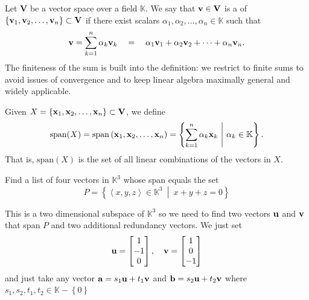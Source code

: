 \begin{dfn}
    Let \( \mathbf{V} \) be a vector space over a field \( \mathbb{K} \).  
    We say that \( \vb{v} \in \mathbf{V} \) is a  of  
    \( \left\{ \vb{v}_{1}, \vb{v}_{2}, \dots, \vb{v}_{n} \right\} \subset \mathbf{V} \)  
    if there exist scalars \( \alpha_{1}, \alpha_{2}, \dots, \alpha_{n} \in \mathbb{K} \) such that  
    \[
        \vb{v} = \sum_{k=1}^{n} \alpha_{k} \vb{v}_{k}
        \quad = \quad
        \alpha_{1} \vb{v}_{1} + \alpha_{2} \vb{v}_{2} + \cdots + \alpha_{n} \vb{v}_{n}.
    \]
    The finiteness of the sum is built into the definition: we restrict to finite sums to avoid issues of convergence and to keep linear algebra maximally general and widely applicable.
\end{dfn}

\begin{dfn}
    Given \( X = \left\{ \vb{x}_{1}, \vb{x}_{2}, \dots, \vb{x}_{n} \right\} \subset \mathbf{V} \), we define
    \[
        \mathrm{span}(X)
        = \mathrm{span} \left( \vb{x}_{1}, \vb{x}_{2}, \dots, \vb{x}_{n} \right)
        = \left\{ \sum_{k=1}^{n} \alpha_{k} \vb{x}_{k} \ \middle| \ \alpha_{k} \in \mathbb{K} \right\}.
    \]
    That is, \( \mathrm{span}(X) \) is the set of all linear combinations of the vectors in \( X \).
\end{dfn}

\begin{exercise}
    Find a list of four vectors in \( \mathbb{K}^{3} \) whose span equals the set 
    \[P= \left\{ \left< x,y,z  \right> \in \mathbb{K}^{3} \ \middle | \ x+y+z =0 \right\} \]
\end{exercise}
\begin{solution}
    This is a two dimensional subspace of \( \mathbb{K}^{3} \) so we need to find two vectors \( \vb{u} \) and \( \vb{v} \) that span \( P \) and two additional redundancy vectors. We just set 
    \[ \vb{u} = \begin{bmatrix}
        1\\
        -1\\
        0\\
    \end{bmatrix}, \quad \vb{v} = \begin{bmatrix}
        1\\
        0\\
        -1\\
    \end{bmatrix} \]
    and just take any vector \( \vb{a} = s_{1} \vb{u} + t_{1}\vb{v} \) and \( \vb{b} = s_{2} \vb{u} + t_{2} \vb{v} \) where \( s_{1}, s_{2}, t_{1}, t_{2} \in \mathbb{K} - \left\{ 0 \right\} \)
\end{solution}

